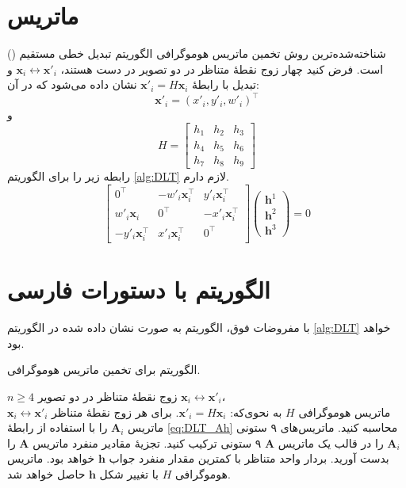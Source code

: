 \section{ماتریس}

شناخته‌شده‌ترین روش تخمین ماتریس هوموگرافی الگوریتم تبدیل خطی مستقیم () است.  فرض کنید چهار زوج نقطهٔ متناظر در دو تصویر در دست هستند،  $\mathbf{x}_i\leftrightarrow\mathbf{x}'_i$   و تبدیل با رابطهٔ
  $\mathbf{x}'_i = H\mathbf{x}_i$
  نشان داده می‌شود که در آن:
\[\mathbf{x}'_i=(x'_i,y'_i,w'_i)^\top  \]
و
\[ H=\left[
\begin{array}{ccc}
h_1 & h_2 & h_3 \\ 
h_4 & h_5 & h_6 \\ 
h_7 & h_8 & h_9
\end{array} 
\right]\]
رابطه زیر را برای الگوریتم  \eqref{alg:DLT} لازم دارم.
\begin{equation}\label{eq:DLT_Ah}
\left[
\begin{array}{ccc}
0^\top & -w'_i\mathbf{x}_i^\top & y'_i\mathbf{x}_i^\top \\ 
w'_i\mathbf{x}_i & 0^\top & -x'_i\mathbf{x}_i^\top \\ 
- y'_i\mathbf{x}_i^\top & x'_i\mathbf{x}_i^\top & 0^\top
\end{array} 
\right]
\left(
\begin{array}{c}
\mathbf{h}^1 \\ 
\mathbf{h}^2 \\ 
\mathbf{h}^3
\end{array} 
\right)=0
\end{equation}

\section{الگوریتم با دستورات فارسی}
با مفروضات فوق، الگوریتم  به صورت نشان داده شده در الگوریتم \eqref{alg:DLT}  خواهد بود.
\begin{algorithm}[t]
\onehalfspacing
\caption{الگوریتم  برای تخمین ماتریس هوموگرافی.} \label{alg:DLT}
\begin{algorithmic}[1]
\REQUIRE $n\geq4$ زوج نقطهٔ متناظر در دو تصویر 
${\mathbf{x}_i\leftrightarrow\mathbf{x}'_i}$،\\
\ENSURE ماتریس هوموگرافی $H$ به نحوی‌که: 
$\mathbf{x}'_i = H \mathbf{x}_i$.
  \STATE برای هر زوج نقطهٔ متناظر
$\mathbf{x}_i\leftrightarrow\mathbf{x}'_i$ 
ماتریس $\mathbf{A}_i$ را با استفاده از رابطهٔ \ref{eq:DLT_Ah} محاسبه کنید.
  \STATE ماتریس‌های ۹ ستونی  $\mathbf{A}_i$ را در قالب یک ماتریس $\mathbf{A}$ ۹ ستونی ترکیب کنید. 
  \STATE تجزیهٔ مقادیر منفرد   ماتریس $\mathbf{A}$ را بدست آورید. بردار واحد متناظر با کمترین مقدار منفرد جواب $\mathbf{h}$ خواهد بود.
  \STATE  ماتریس هوموگرافی $H$ با تغییر شکل $\mathbf{h}$ حاصل خواهد شد.
\end{algorithmic}
\end{algorithm}

